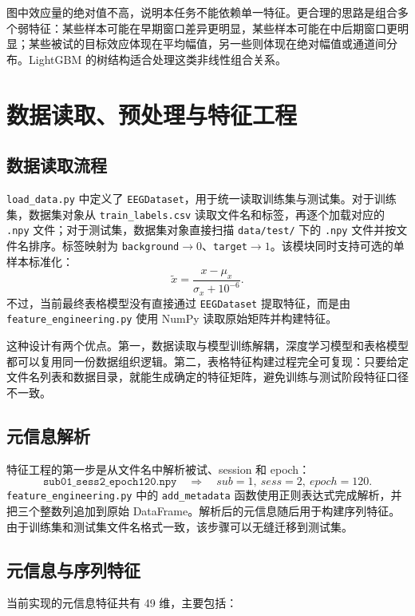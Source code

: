 图中效应量的绝对值不高，说明本任务不能依赖单一特征。更合理的思路是组合多个弱特征：某些样本可能在早期窗口差异更明显，某些样本可能在中后期窗口更明显；某些被试的目标效应体现在平均幅值，另一些则体现在绝对幅值或通道间分布。LightGBM 的树结构适合处理这类非线性组合关系。

\chapter{数据读取、预处理与特征工程}

\section{数据读取流程}

\texttt{load\_data.py} 中定义了 \texttt{EEGDataset}，用于统一读取训练集与测试集。对于训练集，数据集对象从 \texttt{train\_labels.csv} 读取文件名和标签，再逐个加载对应的 \texttt{.npy} 文件；对于测试集，数据集对象直接扫描 \texttt{data/test/} 下的 \texttt{.npy} 文件并按文件名排序。标签映射为 \texttt{background}$\rightarrow0$、\texttt{target}$\rightarrow1$。该模块同时支持可选的单样本标准化：
\[
\tilde{x}=\frac{x-\mu_x}{\sigma_x+10^{-6}}.
\]
不过，当前最终表格模型没有直接通过 \texttt{EEGDataset} 提取特征，而是由 \texttt{feature\_engineering.py} 使用 NumPy 读取原始矩阵并构建特征。

这种设计有两个优点。第一，数据读取与模型训练解耦，深度学习模型和表格模型都可以复用同一份数据组织逻辑。第二，表格特征构建过程完全可复现：只要给定文件名列表和数据目录，就能生成确定的特征矩阵，避免训练与测试阶段特征口径不一致。

\section{元信息解析}

特征工程的第一步是从文件名中解析被试、session 和 epoch：
\[
\texttt{sub01\_sess2\_epoch120.npy}
\quad\Rightarrow\quad
sub=1,\ sess=2,\ epoch=120.
\]
\texttt{feature\_engineering.py} 中的 \texttt{add\_metadata} 函数使用正则表达式完成解析，并把三个整数列追加到原始 DataFrame。解析后的元信息随后用于构建序列特征。由于训练集和测试集文件名格式一致，该步骤可以无缝迁移到测试集。

\section{元信息与序列特征}

当前实现的元信息特征共有 49 维，主要包括：

